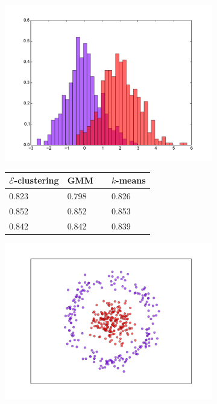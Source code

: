 \documentclass[simplex.tex]{subfiles}
\begin{document}
\begin{figure}[h!]
\begin{cframed}
\centering
\begin{subfigure}[t]{0.45\textwidth}
\centering
\includegraphics[width=\textwidth]{../../figs/hist_gauss1.pdf}\\
\begin{tabular}{ l l l}
\hline
$\mathcal{E}$-clustering &  GMM~~ & $k$-means \\
\hline
0.823 &
0.798 &
0.826 \\
0.852 & 
0.852 & 
0.853 \\
0.842 &
0.842 &
0.839 \\
\hline
\end{tabular}
\end{subfigure}
\begin{subfigure}[t]{0.45\textwidth}
\centering
\includegraphics[width=\textwidth]{../../figs/circles.pdf}

\end{subfigure}
\end{cframed}
\end{figure}
\end{document}
